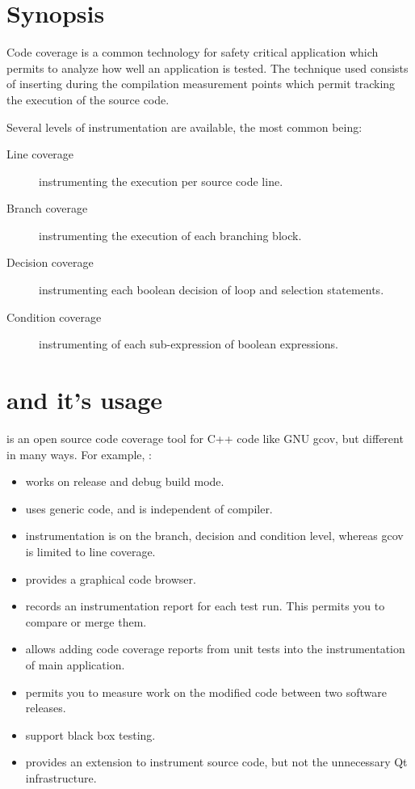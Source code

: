\section{Synopsis}

Code coverage is a common technology for safety critical application which
permits to analyze how well an application is tested.
The technique used consists of inserting during the compilation
measurement points which permit tracking the execution of the source code. 

Several levels of instrumentation are available, the most common being:
\begin{description}
  \item[Line coverage]      instrumenting the execution per source code line. 
  \item[Branch coverage]    instrumenting the execution of each branching block. 
  \item[Decision coverage]  instrumenting each boolean decision of loop
    and selection statements.
  \item[Condition coverage] instrumenting of each sub-expression of boolean
    expressions.
\end{description}

\section{{\TestCocoon} and it's usage}

{\TestCocoon} is an open source code coverage tool for C++ code like GNU gcov,
but different in many ways. For example, \TestCocoon:
\begin{itemize}
  \item  works on release and debug build mode.
  \item  uses generic code, and is independent of compiler.
  \item  instrumentation is on the branch, decision and condition
    level, whereas gcov is limited to line coverage.
  \item  provides a graphical code browser.
  \item  records an instrumentation report for each test run. This
    permits you to compare or merge them.
  \item allows adding code coverage reports from unit tests
   into the instrumentation of main application. 
  \item permits you to measure work on the modified code between two
   software releases. 
  \item  support black box testing.
  \item  provides an extension to instrument {\Qt} source code, but not
   the unnecessary Qt infrastructure.
\end{itemize}


